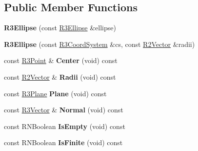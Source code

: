 \subsection*{Public Member Functions}
\begin{DoxyCompactItemize}
\item 
{\bfseries R3\+Ellipse} (const \hyperlink{class_r3_ellipse}{R3\+Ellipse} \&ellipse)\hypertarget{class_r3_ellipse_aaf748d31d339d6c51c69e9688354e59d}{}\label{class_r3_ellipse_aaf748d31d339d6c51c69e9688354e59d}

\item 
{\bfseries R3\+Ellipse} (const \hyperlink{class_r3_coord_system}{R3\+Coord\+System} \&cs, const \hyperlink{class_r2_vector}{R2\+Vector} \&radii)\hypertarget{class_r3_ellipse_a6ce0984c938c2f9a8516e7c77ff6db31}{}\label{class_r3_ellipse_a6ce0984c938c2f9a8516e7c77ff6db31}

\item 
const \hyperlink{class_r3_point}{R3\+Point} \& {\bfseries Center} (void) const \hypertarget{class_r3_ellipse_afbc3d4aa4dddf17cbf420b6c0207e07c}{}\label{class_r3_ellipse_afbc3d4aa4dddf17cbf420b6c0207e07c}

\item 
const \hyperlink{class_r2_vector}{R2\+Vector} \& {\bfseries Radii} (void) const \hypertarget{class_r3_ellipse_a4044585c29d11fa22eeadff4063f768d}{}\label{class_r3_ellipse_a4044585c29d11fa22eeadff4063f768d}

\item 
const \hyperlink{class_r3_plane}{R3\+Plane} {\bfseries Plane} (void) const \hypertarget{class_r3_ellipse_a6ef1f883a52a989779ef53d9c7c13511}{}\label{class_r3_ellipse_a6ef1f883a52a989779ef53d9c7c13511}

\item 
const \hyperlink{class_r3_vector}{R3\+Vector} \& {\bfseries Normal} (void) const \hypertarget{class_r3_ellipse_ada50c9633f6a4e045fb064636d8057e4}{}\label{class_r3_ellipse_ada50c9633f6a4e045fb064636d8057e4}

\item 
const R\+N\+Boolean {\bfseries Is\+Empty} (void) const \hypertarget{class_r3_ellipse_a31b818bab4af14a23271c79fa75f039c}{}\label{class_r3_ellipse_a31b818bab4af14a23271c79fa75f039c}

\item 
const R\+N\+Boolean {\bfseries Is\+Finite} (void) const \hypertarget{class_r3_ellipse_a15820e409d1ed71c33f97ce535a75df7}{}\label{class_r3_ellipse_a15820e409d1ed71c33f97ce535a75df7}


\end{DoxyCompactItemize}
